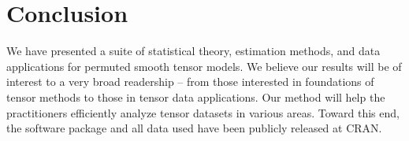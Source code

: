 \documentclass{article}
\theoremstyle{definition}
\begin{document}



\section{Conclusion}\label{sec:con}
We have presented a suite of statistical theory, estimation methods, and data applications for permuted smooth tensor models.
We believe our results will be of interest to a very broad readership – from those interested in foundations of tensor methods to those in tensor data applications.  Our method will help the practitioners efficiently analyze tensor datasets in various areas. Toward this end, the software package and all data used have been publicly released at CRAN.
\end{document}
